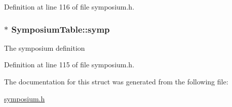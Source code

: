 Definition at line 116 of file symposium.\+h.

\subsubsection[{\texorpdfstring{symp}{symp}}]{$\ast$ Symposium\+Table\+::symp}\hypertarget{structSymposiumTable_a4089e2778ba23eb79c4785eb5702f70f}{}\label{structSymposiumTable_a4089e2778ba23eb79c4785eb5702f70f}
The symposium definition 

Definition at line 115 of file symposium.\+h.



The documentation for this struct was generated from the following file\+:\begin{DoxyCompactItemize}
\item 
\hyperlink{symposium_8h}{symposium.\+h}\end{DoxyCompactItemize}
